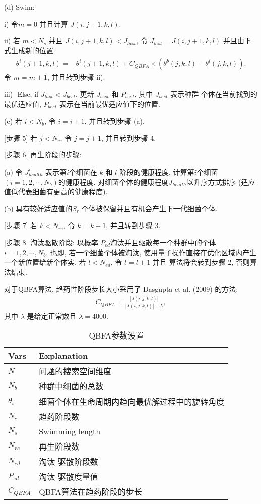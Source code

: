 \quad\quad (d) Swim:

\quad\quad \quad i) 令$m=0$ 并且计算 $J(i,j+1,k,l)$.

\quad\quad \quad ii) 若 $m<N_s$ 并且 $J(i, j+1, k, l)<J_{last}$, 令 $J_{last}=J(i, j+1, k, l)$ 并且由下式生成新的位置
\begin{align}
  \theta^i(j+1,k,l)=&\theta^i(j+1,k,l)+C_{QBFA}
  \times(\theta^b(j,k,l)-\theta^i(j,k,l)).
\end{align}
令 $m=m+1$, 并且转到步骤 ii).

\quad\quad \quad iii)\,\, \textcolor[rgb]{0,0,1}{Else, if} $J_{last}<J_{best}$, 更新 $J_{best}$ 和 $P_{best}$, 其中 $J_{best}$ 表示种群 个体在当前找到的最优适应值, $P_{best}$ 表示在当前最优适应值下的位置.

\quad\quad (e) 若 $i<N_b$, 令 $i=i+1$, 并且转到步骤 (a).

[步骤 5] 若 $j<N_c$, 令 $j=j+1$, 并且转到步骤 4.

[步骤 6] 再生阶段的步骤:

\quad\quad (a) 令 $J_{health}^i$ 表示第$i$个细菌在 $k$ 和 $l$ 阶段的健康程度, 计算第$i$个细菌 $(i=1, 2, \cdots, N_b)$的健康程度. 对细菌个体的健康程度$J_{health}$以升序方式排序 (适应值低代表细菌有更高的健康程度).

\quad\quad (b) 具有较好适应值的$S_r$ 个体被保留并且有机会产生下一代细菌个体.

[步骤 7] 若 $k<N_{re}$, 令 $k=k+1$, 并且转到步骤 3.

[步骤 8] 淘汰驱散阶段: 以概率 $P_{ed}$淘汰并且驱散每一个种群中的个体 $i=1,2,\cdots, N_b$. 也即, 若一个细菌个体被淘汰, 使用量子操作直接在优化区域内产生一个新位置给新个体实. 若 $l<N_{ed}$, 令 $l=l+1$ 并且 算法将会转到步骤 2, 否则算法结束.

对于QBFA算法, 趋药性阶段步长大小采用了 Dasgupta et al. (2009) 的方法:
\begin{align}
    C_{QBFA}=\frac{|J(i,j,k,l)|}{|J(i,j,k,l)|+\lambda},
\end{align}
其中 $\lambda$ 是给定正常数且 $\lambda=4000$.
\begin{table}
\begin{center}
\caption{QBFA参数设置}
\vspace{0.5em}
\centering
\begin{tabularx}{0.72\textwidth}{p{1.05cm}p{9.16cm}}
\hline
Vars &  Explanation\\
\hline
$N$&    问题的搜索空间维度\\
$N_b$&  种群中细菌的总数\\
$\theta_{i\cdot}$&  细菌个体在生命周期内趋向最优解过程中的旋转角度\\
$N_{c}$&  趋药阶段数\\
$N_s$&  Swimming length\\
$N_{re}$&  再生阶段数\\
$N_{ed}$&  淘汰-驱散阶段数\\
$P_{ed}$&  淘汰-驱散度量值\\
$C_{QBFA}$&   QBFA算法在趋药阶段的步长\\
\hline
\end{tabularx}
\label{Para_QBFASys20150225}
\end{center}
\end{table}
